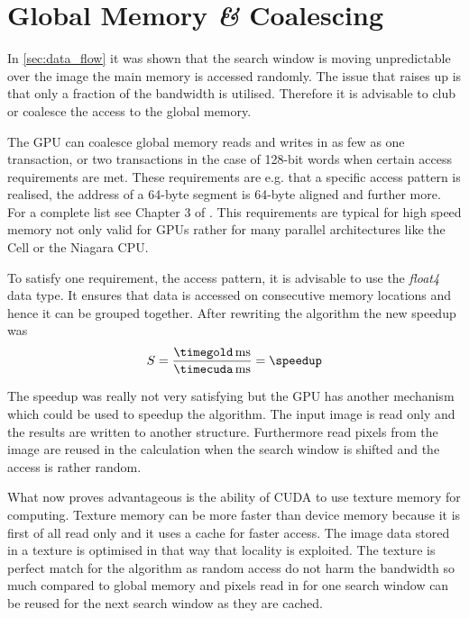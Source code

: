 \section{Global Memory \textit{\&} Coalescing} 
\label{sec:coalescing}
In \autoref{sec:data_flow} it was shown that the search window is moving
unpredictable over the image the main memory is accessed randomly. The 
issue that raises up is that only a fraction of the bandwidth is utilised. 
Therefore it is advisable to club or coalesce the access to the
global memory. 

The \gls{GPU} can coalesce global memory reads and writes in as few as one
transaction, or two transactions in the case of 128-bit words when certain
access requirements are met. These requirements are e.g. that a specific
access pattern is realised, the address of a 64-byte segment is 64-byte aligned 
and further more. For a complete list see Chapter 3 of \citep{citeulike:6584051}.
This requirements are typical for high speed memory not only valid for \glspl{GPU}
rather for many parallel architectures like the Cell or the Niagara \gls{CPU}. 

To satisfy one requirement, the access pattern, it is advisable to use the
\emph{float4} data type. It ensures that data is accessed on consecutive
memory locations and hence it can be grouped together. After rewriting the 
algorithm the new speedup was 
\fpDiv{\speedup}{\timegold}{\timecuda}
\begin{equation*}\label{eq:speedup1}
	S = \frac{\unit[\timegold]{ms}}{\unit[\timecuda]{ms}} = \speedup
\end{equation*}

The speedup was really not very satisfying but the \gls{GPU} has another
mechanism which could be used to speedup the algorithm. The input image is read
only and the results are written to another structure. Furthermore read pixels
from the image are reused in the calculation when the search window is shifted
and the access is rather random.

What now proves advantageous is the ability of \gls{CUDA} to use texture memory
for computing. Texture memory can be more faster than device memory because it is
first of all read only and it uses a cache for faster access. The image data
stored in a texture is optimised in that way that locality is exploited. The
texture is perfect match for the algorithm as random access do not harm the bandwidth
so much compared to global memory and pixels read in for one search window can 
be reused for the next search window as they are cached. 

